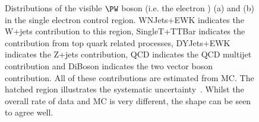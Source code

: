 \begin{figure}
  \caption{Distributions of the visible $\PW$ boson \pt (i.e. the electron \pt) (a) and \METnoMU (b) in the single electron control region. WNJets+EWK indicates the W+jets contribution to this region, SingleT+TTBar indicates the contribution from top quark related processes, DYJets+EWK indicates the Z+jets contribution, \ac{QCD} indicates the \ac{QCD} multijet contribution and DiBoson indicates the two vector boson contribution. All of these contributions are estimated from \ac{MC}. The hatched region illustrates the systematic uncertainty~\cite{ARTICLE:CMSAN-12-403}. Whilst the overall rate of data and \ac{MC} is very different, the shape can be seen to agree well.}
  \label{fig:promptwenu}
\end{figure}

